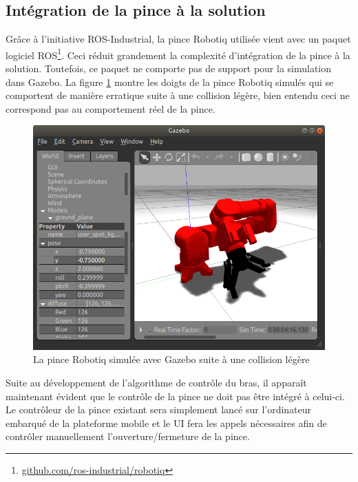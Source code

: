 \subsection{Intégration de la pince à la solution}\label{subsec:pince_gazebo}
Grâce à l'initiative ROS-Industrial, la pince Robotiq utilisée vient avec un paquet logiciel ROS\footnote{\href{https://github.com/ros-industrial/robotiq}{github.com/ros-industrial/robotiq}}. Ceci réduit grandement la complexité d'intégration de la pince à la solution. Toutefois, ce paquet ne comporte pas de support pour la simulation dans Gazebo. La figure \ref{fig:robotiq_gazebo} montre les doigts de la pince Robotiq simulés qui se comportent de manière erratique suite à une collision légère, bien entendu ceci ne correspond pas au comportement réel de la pince.

\begin{figure}
    \centering
    \includegraphics[width=\textwidth]{Figures/gazebo_ovis_sim.png}
    \caption{La pince Robotiq simulée avec Gazebo suite à une collision légère}
    \label{fig:robotiq_gazebo}
\end{figure}

Suite au développement de l'algorithme de contrôle du bras, il apparaît maintenant évident que le contrôle de la pince ne doit pas être intégré à celui-ci. Le contrôleur de la pince existant sera simplement lancé sur l'ordinateur embarqué de la plateforme mobile et le UI fera les appels nécessaires afin de contrôler manuellement l'ouverture/fermeture de la pince.